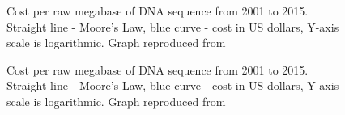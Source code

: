 \newpage
\vspace*{-0.3in}
\begin{figure}[hb!]
\begin{center}
\end{center}
\caption[Cost per raw megabase of DNA sequence from 2001 to 2015]{Cost per raw megabase of DNA sequence from 2001 to 2015. Straight line - Moore's Law, blue curve - cost in US dollars, Y-axis scale is logarithmic. Graph reproduced from \citep{wetterstrand2016}}
\end{figure}
\begin{figure}[hb!]
\begin{center}
\end{center}
\caption[Cost per raw megabase of DNA sequence from 2001 to 2015]{Cost per raw megabase of DNA sequence from 2001 to 2015. Straight line - Moore's Law, blue curve - cost in US dollars, Y-axis scale is logarithmic. Graph reproduced from \citep{wetterstrand2016}}
\end{figure}

